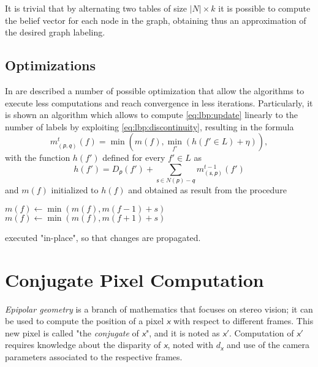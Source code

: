 \documentclass[notitlepage,english]{hgbreport}
\newcommand{\Acronym}[1]{{#1}}
\newcommand{\LBP}{\Acronym{LBP}}
\renewcommand{\vec}[1]{\bm{\mathsfit{#1}}}
\begin{document}
It is trivial that by alternating two tables of size $|N|\times k$ it is possible to compute the belief vector for each node in the graph, obtaining thus an approximation of the desired graph labeling.

\subsection{Optimizations}
In \cite{Felzenszwalb2006} are described a number of possible optimization that allow the algorithms to execute less computations and reach convergence in less iterations.
Particularly, it is shown an algorithm which allows to compute \cref{eq:lbp:update} linearly to the number of labels by exploiting \cref{eq:lbp:discontinuity}, resulting in the formula
\begin{equation}\label{eq:lbp:update2}
	m^t_{(\vec p,\vec q)}(f) = \min\left(m(f), \min_{f'}\left(h(f'\in L)+\eta\right)\right),
\end{equation}
with the function $h(f')$ defined for every $f'\in L$ as 
\begin{equation}
h(f') =D_{\vec p}(f') + \sum_{\vec s\in N(\vec p) - \vec q} m^{t-1}_{(\vec s, \vec p)}(f')
\end{equation}
and $m(f)$ initialized to $h(f)$ and obtained as result from the procedure
\begin{algorithmic}[0]
	\State $m(f)\leftarrow \min \left( m(f), m(f-1) + s\right)$
	\EndFor
	\State $m(f) \leftarrow \min \left( m(f), m(f+1) + s\right)$ 
	\EndFor
\end{algorithmic}
executed "in-place", so that changes are propagated.


\newpage
\section{Conjugate Pixel Computation}\label{app:conjugate_pixel}
\emph{Epipolar geometry} is a branch of mathematics that focuses on stereo vision; it can be used to compute the position of a pixel $\vec x$ with respect to different frames. This new pixel is called "the \emph{conjugate} of $\vec x$", and it is noted as $\vec{x'}$.
Computation of $\vec{x'}$ requires knowledge about the disparity of $\vec x$, noted with $d_{\vec x}$ and use of the camera parameters associated to the respective frames.
%
\end{document}
